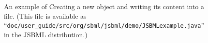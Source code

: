 \begin{figure}[bht]
  \vspace*{-1ex}
  \vspace*{-1ex}
  \caption{An example of Creating a new  object and
    writing its content into a file.  (This file is available as
    ``\texttt{doc/user\_guide/src/org/sbml/jsbml/demo/JSBMLexample.java}''
    in the JSBML distribution.)}
  \label{fig:JSBMLexample-source}
  \vspace*{-1em}
\end{figure}
